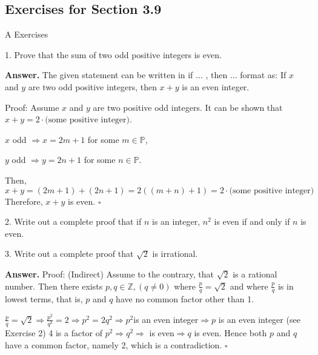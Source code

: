 \documentclass[10pt,]{book}
\theoremstyle{plain}
\theoremstyle{definition}
\theoremstyle{definition}
\theoremstyle{definition}
\theoremstyle{definition}
\begin{document}
\subsection[Exercises for Section 3.9 ]{Exercises for Section 3.9 }\label{exercises-3.9}
\hypertarget{exercisegroup-13}{}\typeout{************************************************}
\typeout{************************************************}
A Exercises%
\begin{exercisegroup}
\item[1.]\hypertarget{exercise-64}{} Prove that the sum of two odd positive integers is even.
%
\par\smallskip
\par\smallskip
\noindent\textbf{Answer.}\hypertarget{answer-29}{}\quad
 The given statement can be written in if \(\dots\) , then \(\dots\) format as: If \(x\) and \(y\) are two odd positive integers, then \(x+y\) is an even integer.%
\par
Proof: Assume \(x\) and \(y\) are two positive odd integers. It can be shown that \(x+y=2 \cdot \textrm{(some positive integer)}\).%
\par
\(x\) odd \(\Rightarrow x=2m+1\) for some \(m\in \mathbb{P}\),%
\par
\(y\) odd \(\Rightarrow y=2n+1\) for some \(n\in \mathbb{P}\).%
\par
Then, \begin{equation*}x+y=(2m+1)+(2n+1)=2((m+n)+1)=2\cdot\textrm{(some positive integer)}\end{equation*}	
Therefore, \(x+y\) is even. \(\square\)%
\item[2.]\hypertarget{exercise-65}{}Write out a complete proof that if \(n\) is an integer, \(n^2\) is even if and only if \(n\) is even.
%
\par\smallskip
\item[3.]\hypertarget{exercise-66}{}Write out a complete proof that \(\sqrt{2}\) is irrational.
%
\par\smallskip
\par\smallskip
\noindent\textbf{Answer.}\hypertarget{answer-30}{}\quad
 Proof: (Indirect) Assume to the contrary, that \(\sqrt{2}\) is a rational number. Then there exists \(p,q\in \mathbb{Z}, (q\neq 0)\) where \(\frac{p}{q}=\sqrt{2}\) and where \(\frac{p}{q}\) is in lowest terms, that is, \(p\) and \(q\) have no common factor other than 1.%
\par
\(\frac{p}{q}=\sqrt{2}\Rightarrow \frac{p^2}{q^2}=2\Rightarrow p^2=2q^2\Rightarrow p^2\)is an even integer\(\Rightarrow p\) is an even integer (see Exercise 2) 4 is a factor of \(p^2\Rightarrow q^2\Rightarrow\) is even\(\Rightarrow q\) is even. Hence both \(p\) and \(q\) have a common factor, namely 2, which is a contradiction. \(\square\)%

\end{exercisegroup}
\end{document}
